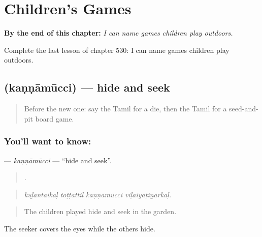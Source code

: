 
\chapter{Children's Games}
\label{ch:ta-children-s-games}

\begin{chapteropening}
\textbf{By the end of this chapter:} \emph{I can name games children play outdoors.}

Complete the last lesson of chapter 530: I can name games children play outdoors.
\end{chapteropening}

\section[\texorpdfstring{\ta{கண்ணாமூச்சி} (kaṇṇāmūcci)}{கண்ணாமூச்சி (kaṇṇāmūcci)}]{ (kaṇṇāmūcci) — hide and seek}

\label{lesson:TA-C530-kannamucci}



\begin{quote}
Before the new one: say the Tamil for a die, then the Tamil for a seed-and-pit board game.
\end{quote}

\subsection*{You'll want to know: }
\textbf{} — \emph{kaṇṇāmūcci} — \textquotedblleft{}hide and seek\textquotedblright{}.

\begin{quote}
   .
\end{quote}

\begin{quote}
\emph{kuḻantaikaḷ tōṭṭattil kaṇṇāmūcci viḷaiyāṭiṉārkaḷ.}
\end{quote}

\begin{quote}
The children played hide and seek in the garden.
\end{quote}

The seeker covers the eyes while the others hide.

